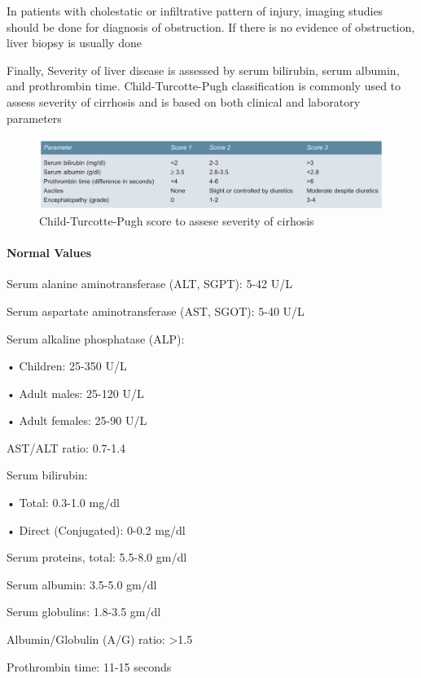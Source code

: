 \documentclass[
  letterpaper,
  DIV=11,
  numbers=noendperiod]{scrreprt}
\let\oldparagraph\paragraph
\renewcommand{\paragraph}[1]{\oldparagraph{#1}\mbox{}}
\begin{document}
In patients with cholestatic or infiltrative pattern of injury, imaging
studies should be done for diagnosis of obstruction. If there is no
evidence of obstruction, liver biopsy is usually done

Finally, Severity of liver disease is assessed by serum bilirubin, serum
albumin, and prothrombin time. Child-Turcotte-Pugh classification is
commonly used to assess severity of cirrhosis and is based on both
clinical and laboratory parameters

\begin{figure}

{\centering \includegraphics{image/CTP.png}

}

\caption{Child-Turcotte-Pugh score to assese severity of cirhosis}

\end{figure}%

\paragraph{Normal Values}\label{normal-values}

Serum alanine aminotransferase (ALT, SGPT): 5-42 U/L

Serum aspartate aminotransferase (AST, SGOT): 5-40 U/L

Serum alkaline phosphatase (ALP):

• Children: 25-350 U/L

• Adult males: 25-120 U/L

• Adult females: 25-90 U/L

AST/ALT ratio: 0.7-1.4

Serum bilirubin:

• Total: 0.3-1.0 mg/dl

• Direct (Conjugated): 0-0.2 mg/dl

Serum proteins, total: 5.5-8.0 gm/dl

Serum albumin: 3.5-5.0 gm/dl

Serum globulins: 1.8-3.5 gm/dl

Albumin/Globulin (A/G) ratio: \textgreater1.5

Prothrombin time: 11-15 seconds
\end{document}
